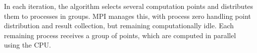 \documentclass[runningheads]{llncs}
\begin{document}



In each iteration, the algorithm selects several computation points and distributes them to processes in groups. MPI manages this, with process zero handling point distribution and result collection, but remaining computationally idle. Each remaining process receives a group of points, which are computed in parallel using the CPU.

\end{document}
